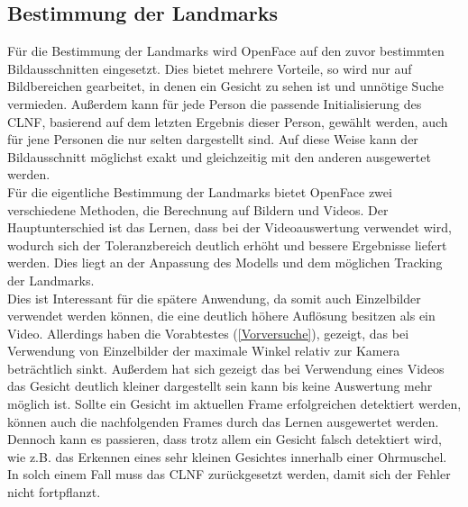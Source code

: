 \subsection{Bestimmung der Landmarks}
\label{bestimmung_Landmarks}
Für die Bestimmung der Landmarks wird OpenFace auf den zuvor bestimmten Bildausschnitten eingesetzt. Dies bietet mehrere Vorteile, so wird nur auf Bildbereichen gearbeitet, in denen ein Gesicht zu sehen ist und unnötige Suche vermieden. Außerdem kann für jede Person die passende Initialisierung des CLNF, basierend auf dem letzten Ergebnis dieser Person, gewählt werden, auch für jene Personen die nur selten dargestellt sind. Auf diese Weise kann der Bildausschnitt möglichst exakt und gleichzeitig mit den anderen ausgewertet werden.\\
Für die eigentliche Bestimmung der Landmarks bietet OpenFace zwei verschiedene Methoden, die Berechnung auf Bildern und Videos. Der Hauptunterschied ist das Lernen, dass bei der Videoauswertung verwendet wird, wodurch sich der Toleranzbereich deutlich erhöht und bessere Ergebnisse liefert werden. Dies liegt an der Anpassung des Modells und dem möglichen Tracking der Landmarks.\\
Dies ist Interessant für die spätere Anwendung, da somit auch Einzelbilder verwendet werden können, die eine deutlich höhere Auflösung besitzen als ein Video. Allerdings haben die Vorabtestes (\autoref{Vorversuche}), gezeigt, das bei Verwendung von Einzelbilder der maximale Winkel relativ zur Kamera beträchtlich sinkt. Außerdem hat sich gezeigt das bei Verwendung eines Videos das Gesicht deutlich kleiner dargestellt sein kann bis keine Auswertung mehr möglich ist. Sollte ein Gesicht im aktuellen Frame erfolgreichen detektiert werden, können auch die nachfolgenden Frames durch das Lernen ausgewertet werden.\\
Dennoch kann es passieren, dass trotz allem ein Gesicht falsch detektiert wird, wie z.B. das Erkennen eines sehr kleinen Gesichtes innerhalb einer Ohrmuschel. In solch einem Fall muss das CLNF zurückgesetzt werden, damit sich der Fehler nicht fortpflanzt.
